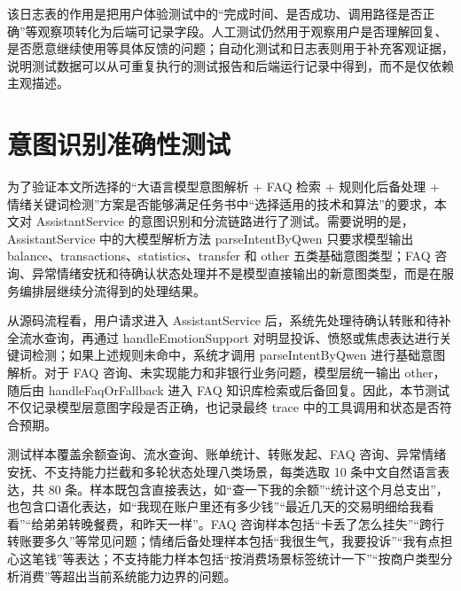 \documentclass[bachelor, print]{xduthesis}
\begin{document}
该日志表的作用是把用户体验测试中的“完成时间、是否成功、调用路径是否正确”等观察项转化为后端可记录字段。人工测试仍然用于观察用户是否理解回复、是否愿意继续使用等具体反馈的问题；自动化测试和日志表则用于补充客观证据，说明测试数据可以从可重复执行的测试报告和后端运行记录中得到，而不是仅依赖主观描述。

\section{意图识别准确性测试}

为了验证本文所选择的“大语言模型意图解析 + FAQ 检索 + 规则化后备处理 + 情绪关键词检测”方案是否能够满足任务书中“选择适用的技术和算法”的要求，本文对 AssistantService 的意图识别和分流链路进行了测试。需要说明的是，AssistantService 中的大模型解析方法 parseIntentByQwen 只要求模型输出 balance、transactions、statistics、transfer 和 other 五类基础意图类型；FAQ 咨询、异常情绪安抚和待确认状态处理并不是模型直接输出的新意图类型，而是在服务编排层继续分流得到的处理结果。

从源码流程看，用户请求进入 AssistantService 后，系统先处理待确认转账和待补全流水查询，再通过 handleEmotionSupport 对明显投诉、愤怒或焦虑表达进行关键词检测；如果上述规则未命中，系统才调用 parseIntentByQwen 进行基础意图解析。对于 FAQ 咨询、未实现能力和非银行业务问题，模型层统一输出 other，随后由 handleFaqOrFallback 进入 FAQ 知识库检索或后备回复。因此，本节测试不仅记录模型层意图字段是否正确，也记录最终 trace 中的工具调用和状态是否符合预期。

测试样本覆盖余额查询、流水查询、账单统计、转账发起、FAQ 咨询、异常情绪安抚、不支持能力拦截和多轮状态处理八类场景，每类选取 10 条中文自然语言表达，共 80 条。样本既包含直接表达，如“查一下我的余额”“统计这个月总支出”，也包含口语化表达，如“我现在账户里还有多少钱”“最近几天的交易明细给我看看”“给弟弟转晚餐费，和昨天一样”。FAQ 咨询样本包括“卡丢了怎么挂失”“跨行转账要多久”等常见问题；情绪后备处理样本包括“我很生气，我要投诉”“我有点担心这笔钱”等表达；不支持能力样本包括“按消费场景标签统计一下”“按商户类型分析消费”等超出当前系统能力边界的问题。
\end{document}
